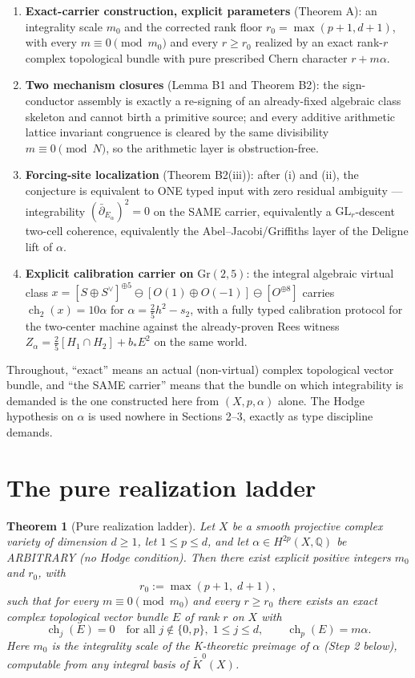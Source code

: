 \documentclass[11pt]{article}
\newtheorem{theorem}{Theorem}
\newcommand{\ch}{\operatorname{ch}}
\newcommand{\ddbar}{\bar\partial}
\begin{document}
\begin{enumerate}
\item[\textup{(i)}] \textbf{Exact-carrier construction, explicit parameters}
(Theorem A): an integrality scale $m_0$ and the corrected rank floor
$r_0=\max(p+1,d+1)$, with every $m\equiv 0 \pmod {m_0}$ and every
$r\ge r_0$ realized by an exact rank-$r$ complex topological bundle
with pure prescribed Chern character $r+m\alpha$.
\item[\textup{(ii)}] \textbf{Two mechanism closures} (Lemma B1 and
Theorem B2): the sign-conductor assembly is exactly a re-signing of an
already-fixed algebraic class skeleton and cannot birth a primitive
source; and every additive arithmetic lattice invariant congruence is
cleared by the same divisibility $m\equiv 0 \pmod N$, so the arithmetic
layer is obstruction-free.
\item[\textup{(iii)}] \textbf{Forcing-site localization} (Theorem B2(iii)):
after (i) and (ii), the conjecture is equivalent to ONE typed input with
zero residual ambiguity --- integrability
$(\ddbar_{E_\alpha})^2=0$ on the SAME carrier, equivalently a
$\mathrm{GL}_r$-descent two-cell coherence, equivalently the
Abel--Jacobi/Griffiths layer of the Deligne lift of $\alpha$.
\item[\textup{(iv)}] \textbf{Explicit calibration carrier on}
$\mathrm{Gr}(2,5)$: the integral algebraic virtual class
$x=[S\oplus S^\vee]^{\oplus 5}\ominus[O(1)\oplus O(-1)]\ominus[O^{\oplus 8}]$
carries $\ch_2(x)=10\alpha$ for
$\alpha=\tfrac25 h^2-s_2$, with a fully typed calibration protocol for the
two-center machine against the already-proven Rees witness
$Z_\alpha=\tfrac25[H_1\cap H_2]+b_*E^2$ on the same world.
\end{enumerate}

Throughout, ``exact'' means an actual (non-virtual) complex topological
vector bundle, and ``the SAME carrier'' means that the bundle on which
integrability is demanded is the one constructed here from
$(X,p,\alpha)$ alone. The Hodge hypothesis on $\alpha$ is used nowhere
in Sections 2--3, exactly as type discipline demands.

\section{The pure realization ladder}
\begin{theorem}[Pure realization ladder]\label{thm:A}
Let $X$ be a smooth projective complex variety of dimension $d\ge 1$,
let $1\le p\le d$, and let
$\alpha\in H^{2p}(X,\mathbb Q)$ be ARBITRARY (no Hodge condition).
Then there exist explicit positive integers $m_0$ and $r_0$, with
\[
  r_0:=\max(p+1,\;d+1),
\]
such that for every $m\equiv 0 \pmod {m_0}$ and every $r\ge r_0$
there exists an exact complex topological vector bundle $E$ of rank $r$
on $X$ with
\[
  \boxed{\;
  \ch_j(E)=0\quad\text{for all }j\notin\{0,p\},\; 1\le j\le d,
  \qquad
  \ch_p(E)=m\alpha.\;}
\]
Here $m_0$ is the integrality scale of the K-theoretic preimage of
$\alpha$ (Step 2 below), computable from any integral basis of
$\widetilde K^0(X)$.
\end{theorem}
\end{document}
